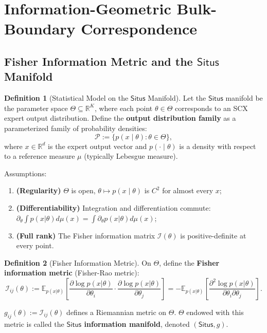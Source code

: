 \documentclass[12pt,a4paper]{article}
\theoremstyle{definition}
\newtheorem{definition}{Definition}[section]
\theoremstyle{remark}
\theoremstyle{definition}
\newcommand{\R}{\mathbb{R}}
\newcommand{\E}{\mathbb{E}}
\newcommand{\Situs}{\textsf{Situs}}
\newcommand{\Fisher}{\mathcal{I}}
\begin{document}
\newpage

\section{Information-Geometric Bulk-Boundary Correspondence}
\label{sec:info}

\subsection{Fisher Information Metric and the $\Situs$ Manifold}

\begin{definition}[Statistical Model on the $\Situs$ Manifold]\label{def:situs_stat}
Let the $\Situs$ manifold be the parameter space $\Theta \subseteq \R^K$, where each point $\theta \in \Theta$ corresponds to an SCX expert output distribution.
Define the \textbf{output distribution family} as a parameterized family of probability densities:
\[
    \mathcal{P} := \{p(x \mid \theta) : \theta \in \Theta\},
\]
where $x \in \R^d$ is the expert output vector and $p(\cdot \mid \theta)$ is a density with respect to a reference measure $\mu$ (typically Lebesgue measure).

Assumptions:
\begin{enumerate}[label=(A\arabic*)]
    \item \textbf{(Regularity)} $\Theta$ is open, $\theta \mapsto p(x \mid \theta)$ is $C^2$ for almost every $x$;
    \item \textbf{(Differentiability)} Integration and differentiation commute: $\partial_\theta \int p(x|\theta) d\mu(x) = \int \partial_\theta p(x|\theta) d\mu(x)$;
    \item \textbf{(Full rank)} The Fisher information matrix $\Fisher(\theta)$ is positive-definite at every point.
\end{enumerate}
\end{definition}

\begin{definition}[Fisher Information Metric]\label{def:fisher_metric}
On $\Theta$, define the \textbf{Fisher information metric} (Fisher-Rao metric):
\[
    \Fisher_{ij}(\theta) := \E_{p(x|\theta)}\left[
        \frac{\partial \log p(x|\theta)}{\partial \theta_i} \cdot
        \frac{\partial \log p(x|\theta)}{\partial \theta_j}
    \right]
    = -\E_{p(x|\theta)}\left[
        \frac{\partial^2 \log p(x|\theta)}{\partial \theta_i \partial \theta_j}
    \right].
\]

$g_{ij}(\theta) := \Fisher_{ij}(\theta)$ defines a Riemannian metric on $\Theta$.
$\Theta$ endowed with this metric is called the \textbf{$\Situs$ information manifold}, denoted $(\Situs, g)$.
\end{definition}
\end{document}
